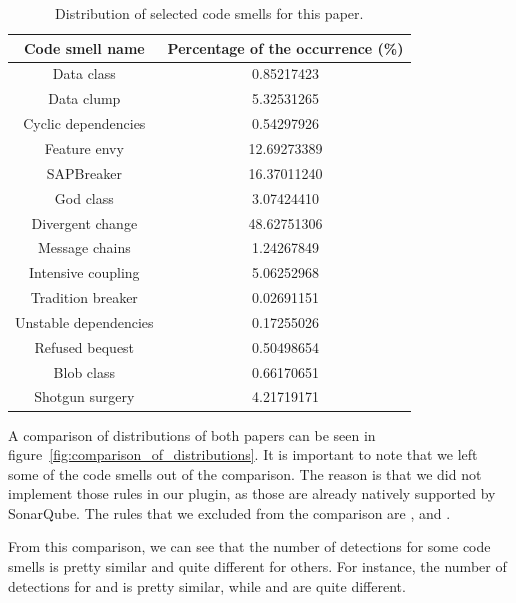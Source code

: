 \begin{table}
    \begin{center}
        \begin{tabular} {| c | c |}
            \hline
            \textbf{Code smell name} & \textbf{Percentage of the occurrence (\%)} \\ \hline
            Data class & 0.85217423 \\ \hline
            Data clump & 5.32531265 \\ \hline
            Cyclic dependencies & 0.54297926 \\ \hline
            Feature envy & 12.69273389 \\ \hline
            SAPBreaker & 16.37011240 \\ \hline
            God class & 3.07424410 \\ \hline
            Divergent change & 48.62751306 \\ \hline
            Message chains & 1.24267849 \\ \hline
            Intensive coupling & 5.06252968 \\ \hline
            Tradition breaker & 0.02691151 \\ \hline
            Unstable dependencies & 0.17255026 \\ \hline
            Refused bequest & 0.50498654 \\ \hline
            Blob class & 0.66170651 \\ \hline
            Shotgun surgery & 4.21719171 \\ \hline
        \end{tabular}
        \caption{Distribution of selected code smells for this paper.}
        \label{tab:sonar_academic_plugin_values}
    \end{center}
\end{table}

A comparison of distributions of both papers can be seen in figure~\ref{fig:comparison_of_distributions}.
It is important to note that we left some of the code smells out of the comparison.
The reason is that we did not implement those rules in our plugin, as those are already natively
supported by SonarQube.
The rules that we excluded from the comparison are ,  and
.


From this comparison, we can see that the number of detections for some code smells is pretty similar and quite different for others.
For instance, the number of detections for  and  is pretty similar, while
 and  are quite different.

